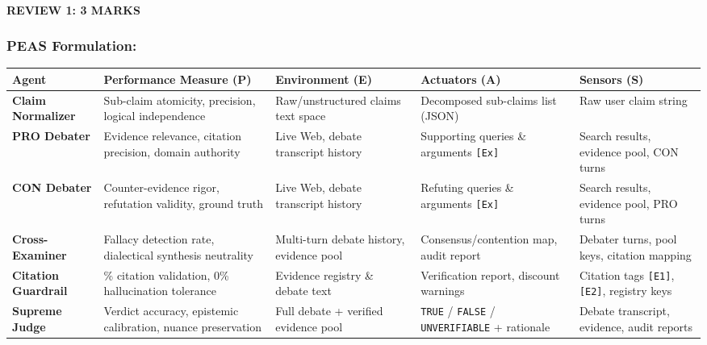 \documentclass[aspectratio=169, 10pt]{beamer}
\begin{document}
\begin{frame}
    \framesubtitle{REVIEW 1: 3 MARKS}
    \frametitle{PEAS Formulation:}
    \vspace{-0.15cm}
    \setlength{\tabcolsep}{3.5pt}
    \renewcommand{\arraystretch}{1.12}
    \scriptsize
    \noindent
    \begin{tabularx}{\textwidth}{l >{\hsize=1.18\hsize\raggedright\arraybackslash}X >{\hsize=0.88\hsize\raggedright\arraybackslash}X >{\hsize=1.00\hsize\raggedright\arraybackslash}X >{\hsize=0.94\hsize\raggedright\arraybackslash}X}
        \toprule
        \rowcolor{HeaderBg}
        \textbf{Agent} & \textbf{Performance Measure (P)} & \textbf{Environment (E)} & \textbf{Actuators (A)} & \textbf{Sensors (S)} \\
        \midrule
        \textbf{Claim Normalizer} & Sub-claim atomicity, precision, logical independence & Raw/unstructured claims text space & Decomposed sub-claims list (JSON) & Raw user claim string \\
        \rowcolor{RowAlt}
        \textbf{PRO Debater} & Evidence relevance, citation precision, domain authority & Live Web, debate transcript history & Supporting queries \& arguments \texttt{[Ex]} & Search results, evidence pool, CON turns \\
        \textbf{CON Debater} & Counter-evidence rigor, refutation validity, ground truth & Live Web, debate transcript history & Refuting queries \& arguments \texttt{[Ex]} & Search results, evidence pool, PRO turns \\
        \rowcolor{RowAlt}
        \textbf{Cross-Examiner} & Fallacy detection rate, dialectical synthesis neutrality & Multi-turn debate history, evidence pool & Consensus/contention map, audit report & Debater turns, pool keys, citation mapping \\
        \textbf{Citation Guardrail} & 100\% citation validation, 0\% hallucination tolerance & Evidence registry \& debate text & Verification report, discount warnings & Citation tags \texttt{[E1]}, \texttt{[E2]}, registry keys \\
        \rowcolor{RowAlt}
        \textbf{Supreme Judge} & Verdict accuracy, epistemic calibration, nuance preservation & Full debate + verified evidence pool & \texttt{TRUE} / \texttt{FALSE} / \texttt{UNVERIFIABLE} + rationale & Debate transcript, evidence, audit reports \\
        \bottomrule
    \end{tabularx}
\end{frame}
\end{document}
